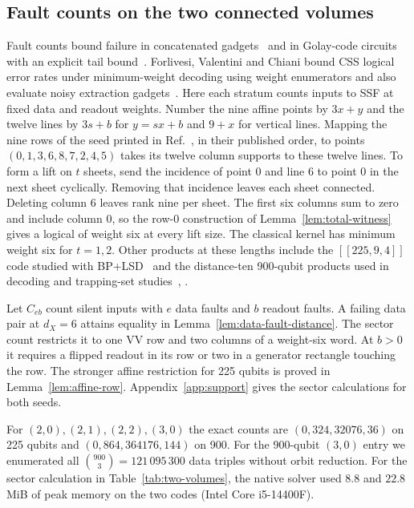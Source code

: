 \documentclass[10pt,twocolumn]{article}
\theoremstyle{definition}
\begin{document}
\subsection{Fault counts on the two connected volumes}\label{app:two-volumes}
Fault counts bound failure in concatenated gadgets~\cite[Sec.~6]{AGP06}
and in Golay-code circuits with an explicit tail bound~\cite[Sec.~4.2 and App.~A]{PR12}.
Forlivesi, Valentini and Chiani bound CSS logical error rates under
minimum-weight decoding using weight enumerators and also evaluate
noisy extraction gadgets~\cite[Sec.~5 and Figs.~8--9]{FVC25}.
Here each stratum counts inputs to SSF at fixed data and readout weights.
Number the nine affine points by $3x+y$ and the twelve lines by
$3s+b$ for $y=sx+b$ and $9+x$ for vertical lines. Mapping the nine
rows of the seed printed in Ref.~\cite[Methods]{LEB26}, in their
published order, to points $(0,1,3,6,8,7,2,4,5)$ takes its twelve
column supports to these twelve lines. To form a lift on $t$ sheets,
send the incidence of point 0 and line 6 to point 0 in the next sheet
cyclically. Removing that incidence leaves each sheet connected.
Deleting column 6 leaves rank nine per sheet. The first six columns
sum to zero and include column 0, so the row-0 construction of
Lemma~\ref{lem:total-witness} gives a logical of weight six at every
lift size. The classical kernel has minimum weight six for $t=1,2$.
Other products at these lengths include the $[[225,9,4]]$ code studied
with BP+LSD~\cite{Hillmann25} and the distance-ten 900-qubit products
used in decoding and trapping-set studies~\cite[Fig.~5]{QUITS25},
\cite[Table~2]{RV21}.

Let $C_{eb}$ count silent inputs with $e$ data faults and $b$ readout
faults. A failing data pair at $d_X=6$ attains equality in
Lemma~\ref{lem:data-fault-distance}.
The sector count restricts it to one VV row and two columns of a
weight-six word. At $b>0$ it requires a flipped readout in its row or two in a
generator rectangle touching the row. The stronger affine restriction for 225 qubits is proved in
Lemma~\ref{lem:affine-row}. Appendix~\ref{app:support} gives the
sector calculations for both seeds.

For $(2,0),(2,1),(2,2),(3,0)$ the exact counts are $(0,324,32076,36)$
on 225 qubits and $(0,864,364176,144)$ on 900. For the 900-qubit
$(3,0)$ entry we enumerated all $\binom{900}{3}=121\,095\,300$ data
triples without orbit reduction. For the sector calculation in
Table~\ref{tab:two-volumes}, the native solver used $8.8$ and
$22.8$ MiB of peak memory on the two codes (Intel Core i5-14400F).
\end{document}
